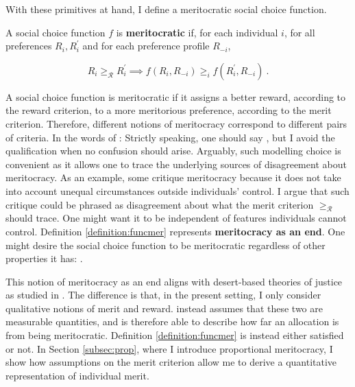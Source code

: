 With these primitives at hand, I define a meritocratic social choice function.

\begin{definition}\label{definition:funcmer}
	A social choice function \( f \) is \textbf{meritocratic} if, for each individual \( i \), for all preferences \( R_i, R_i^{\prime} \) and for each preference profile \( R_{-i} \),

	\[ R_i \geq_{\mathcal{R}} R^{\prime}_i \implies f ( R_i, R_{-i} ) \geq_i f ( R_i^{\prime}, R_{-i} ) \: .\]
\end{definition}

A social choice function is meritocratic if it assigns a better reward, according to the reward criterion, to a more meritorious preference, according to the merit criterion. Therefore, different notions of meritocracy correspond to different pairs of criteria. In the words of \cite{senMeritJustice2000}:  Strictly speaking, one should say , but I avoid the qualification when no confusion should arise. Arguably, such modelling choice is convenient as it allows one to trace the underlying sources of disagreement about meritocracy. As an example, some critique meritocracy because it does not take into account unequal circumstances outside individuals' control. I argue that such critique could be phrased as disagreement about what the merit criterion \( \geq_{\mathcal{R}} \) should trace. One might want it to be independent of features individuals cannot control. Definition \ref{definition:funcmer} represents \textbf{meritocracy as an end}. One might desire the social choice function to be meritocratic regardless of other properties it has:  \citep[p. 2]{sep-meritocracy}.

This notion of meritocracy as an end aligns with desert-based theories of justice as studied in \cite{kaganGeometryDesert2014}. The difference is that, in the present setting, I only consider qualitative notions of merit and reward. \cite{kaganGeometryDesert2014} instead assumes that these two are measurable quantities, and is therefore able to describe how far an allocation is from being meritocratic. Definition \ref{definition:funcmer} is instead either satisfied or not. In Section \ref{subsec:prop}, where I introduce proportional meritocracy, I show how assumptions on the merit criterion allow me to derive a quantitative representation of individual merit.

